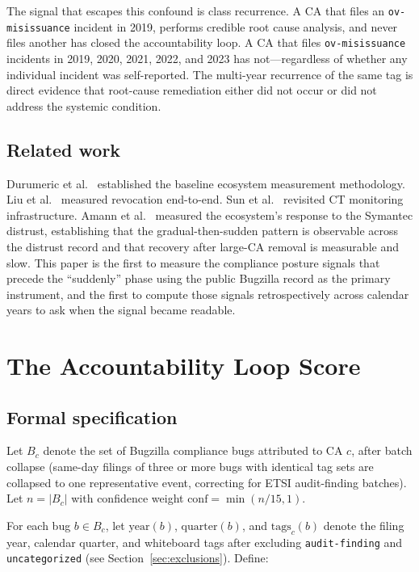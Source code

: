 \documentclass[10pt,twocolumn,letterpaper]{article}
\begin{document}
The signal that escapes this confound is class recurrence. A CA that files an
\texttt{ov-misissuance} incident in 2019, performs credible root cause analysis, and never
files another has closed the accountability loop. A CA that files \texttt{ov-misissuance}
incidents in 2019, 2020, 2021, 2022, and 2023 has not---regardless of whether any
individual incident was self-reported. The multi-year recurrence of the same tag is direct
evidence that root-cause remediation either did not occur or did not address the systemic
condition.

\subsection{Related work}

Durumeric et al.~\cite{durumeric2013} established the baseline ecosystem measurement
methodology. Liu et al.~\cite{liu2015} measured revocation end-to-end. Sun et
al.~\cite{sun2024} revisited CT monitoring infrastructure. Amann et al.~\cite{amann2017}
measured the ecosystem's response to the Symantec distrust, establishing that the
gradual-then-sudden pattern is observable across the distrust record and that recovery
after large-CA removal is measurable and slow. This paper is the first to measure the
compliance posture signals that precede the ``suddenly'' phase using the public Bugzilla
record as the primary instrument, and the first to compute those signals retrospectively
across calendar years to ask when the signal became readable.

\section{The Accountability Loop Score}
\label{sec:als}

\subsection{Formal specification}

Let $B_c$ denote the set of Bugzilla compliance bugs attributed to CA $c$, after
batch collapse (same-day filings of three or more bugs with identical tag sets are
collapsed to one representative event, correcting for ETSI audit-finding batches).
Let $n = |B_c|$ with confidence weight $\text{conf} = \min(n/15, 1)$.

For each bug $b \in B_c$, let $\text{year}(b)$, $\text{quarter}(b)$, and
$\text{tags}_c(b)$ denote the filing year, calendar quarter, and whiteboard tags
after excluding \texttt{audit-finding} and \texttt{uncategorized} (see
Section~\ref{sec:exclusions}). Define:
\end{document}

